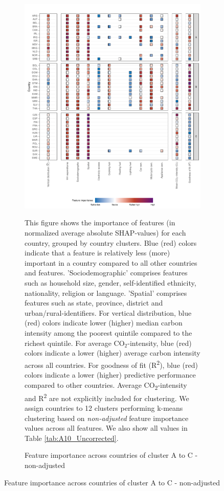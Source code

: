\clearpage
\begin{figure}[ht!]
    \centering
    \caption{Feature importance across countries by cluster - Alternative clustering}\label{fig:fig_4_uncorrected}
    \begin{subfigure}[b]{\textwidth}
    \centering
    \caption{Feature importance across countries of cluster A to C - non-adjusted}\label{fig:fig_4_1_uncorrected}
    \includegraphics{1_Figures/Figure 4/Figure_4_Uncorrected_1.pdf}
     \begin{subcaption2}
    This figure shows the importance of features (in normalized average absolute SHAP-values) for each country, grouped by country clusters. Blue (red) colors indicate that a feature is relatively less (more) important in a country compared to all other countries and features. 'Sociodemographic' comprises features such as household size, gender, self-identified ethnicity, nationality, religion or language. 'Spatial' comprises features such as state, province, district and urban/rural-identifiers. For vertical distribution, blue (red) colors indicate lower (higher) median carbon intensity among the poorest quintile compared to the richest quintile. For average CO$_{2}$-intensity, blue (red) colors indicate a lower (higher) average carbon intensity across all countries. For goodness of fit (R\textsuperscript{2}), blue (red) colors indicate a lower (higher) predictive performance compared to other countries. Average CO\textsubscript{2}-intensity and R\textsuperscript{2} are not explicitly included for clustering.
    We assign countries to 12 clusters performing k-means clustering based on \textit{non-adjusted} feature importance values across all features. We also show all values in Table \ref{tab:A10_Uncorrected}.
    \end{subcaption2}
    \end{subfigure}
\end{figure}
\clearpage

